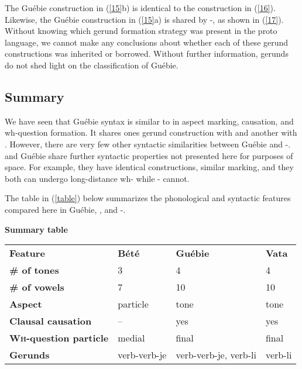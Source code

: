 \documentclass[output=paper,modfonts]{langscibook}
\begin{document}
The Guébie construction in (\ref{15}b) is identical to the  construction in (\ref{16}). Likewise, the Guébie construction in (\ref{15}a) is shared by -, as shown in (\ref{17}). Without knowing which gerund formation strategy was present in the proto language, we cannot make any conclusions about whether each of these gerund constructions was inherited or borrowed. Without further information, gerunds do not shed light on the classification of Guébie.

\subsection{Summary}
We have seen that Guébie syntax is similar to  in aspect marking, causation, and wh-question formation. It shares ones gerund construction with  and another with . However, there are very few other syntactic similarities between Guébie and -.  and Guébie share further syntactic properties not presented here for purposes of space. For example, they have identical  constructions, similar  marking, and they both can undergo long-distance wh- while - cannot.%

The table in (\ref{table}) below summarizes the phonological and syntactic features compared here in Guébie, , and -.

\begin{exe}
\ex \textbf{Summary table}\label{table}\\
\begin{tabular}{llll}
\textbf{Feature} & \textbf{Bété} & \textbf{Guébie} & \textbf{Vata} \\
\textbf{\# of tones} & 3 & 4 & 4 \\
\textbf{\# of vowels} & 7 & 10 & 10 \\
\textbf{Aspect} & particle & tone & tone \\
\textbf{Clausal causation} & -- & yes & yes \\
\textbf{\textsc{Wh}-question particle} & medial & final & final \\
\textbf{Gerunds} & verb-verb-je & verb-verb-je, verb-li & verb-li \\
\end{tabular}
\end{exe}
\end{document}
